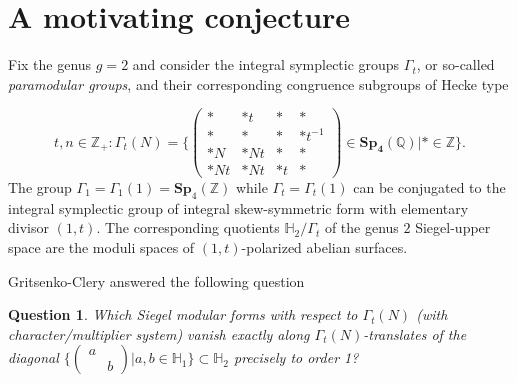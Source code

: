\documentclass[9pt]{amsart} \usepackage[utf8]{inputenc}
\newtheorem{question}{Question}
\begin{document}


%
%

\tableofcontents

\section{A motivating conjecture}
Fix the genus $g = 2$ and consider the integral symplectic groups
$\Gamma_t$, or so-called \textit{paramodular groups}, and their
corresponding congruence subgroups of Hecke type

$$t,n \in \mathbb{Z}_+: \Gamma_t(N) =
\{\begin{pmatrix}*&*t&*&*\\*&*&*&*t^{-1}\\*N&*Nt&*&*\\*Nt&*Nt&*t&*\end{pmatrix}
\in \mathbf{Sp_4}(\mathbb{Q})| *\in\mathbb{Z}\}.$$
The group $\Gamma_1 = \Gamma_1(1) =  \mathbf{Sp}_4(\mathbb{Z})$ while $\Gamma_t = \Gamma_t(1)$ can be conjugated to the integral
symplectic group of integral skew-symmetric form with elementary
divisor $(1,t)$. The corresponding quotients $\mathbb{H}_2/\Gamma_t$ of the genus $2$
Siegel-upper space are the moduli spaces of $(1,t)$-polarized abelian
surfaces.

Gritsenko-Clery\cite{GC} answered the following question

\begin{question}
Which Siegel modular forms with respect to $\Gamma_t(N)$ (with
character/multiplier system) vanish exactly along
$\Gamma_t(N)$-translates of the diagonal
$\{\begin{pmatrix}a&\\&b\end{pmatrix}|a,b \in \mathbb{H}_1\} \subset
\mathbb{H}_2$ precisely to order 1?
\end{question}
\end{document}
